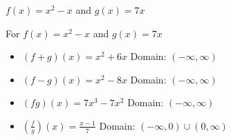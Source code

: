 {$f(x) = x^2-x$ and $g(x) = 7x$}
{For $f(x) = x^2-x$ and $g(x) = 7x$

\begin{itemize}
\item $(f+g)(x) = x^2+6x$
      Domain: $(-\infty, \infty)$
\item $(f-g)(x) = x^2-8x$
      Domain:  $(-\infty, \infty)$
\item $(fg)(x) = 7x^3-7x^2$
      Domain: $(-\infty, \infty)$
\item $\left(\frac{f}{g}\right)(x) = \frac{x-1}{7}$
      Domain:  $\left(-\infty, 0 \right) \cup \left(0, \infty \right)$
\end{itemize}
}